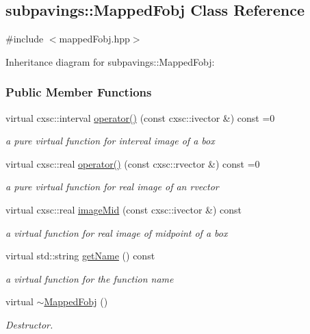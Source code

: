 \hypertarget{classsubpavings_1_1MappedFobj}{\subsection{subpavings\-:\-:\-Mapped\-Fobj \-Class \-Reference}
\label{classsubpavings_1_1MappedFobj}
}


{\ttfamily \#include $<$mapped\-Fobj.\-hpp$>$}



\-Inheritance diagram for subpavings\-:\-:\-Mapped\-Fobj\-:
\subsubsection*{\-Public \-Member \-Functions}
\begin{DoxyCompactItemize}
\item 
virtual cxsc\-::interval \hyperlink{classsubpavings_1_1MappedFobj_aad44e53cb112ea94a970a9bf3888fa6b}{operator()} (const cxsc\-::ivector \&) const =0
\begin{DoxyCompactList}\small\item\em a pure virtual function for interval image of a box \end{DoxyCompactList}\item 
virtual cxsc\-::real \hyperlink{classsubpavings_1_1MappedFobj_aed79714dcf7fb4eb54d0488428909291}{operator()} (const cxsc\-::rvector \&) const =0
\begin{DoxyCompactList}\small\item\em a pure virtual function for real image of an rvector \end{DoxyCompactList}\item 
virtual cxsc\-::real \hyperlink{classsubpavings_1_1MappedFobj_afc045feebc8ad8fc2a84e0532bf0648d}{image\-Mid} (const cxsc\-::ivector \&) const 
\begin{DoxyCompactList}\small\item\em a virtual function for real image of midpoint of a box \end{DoxyCompactList}\item 
virtual std\-::string \hyperlink{classsubpavings_1_1MappedFobj_a852f7fc0282f2e331f4c10f459dc96ae}{get\-Name} () const 
\begin{DoxyCompactList}\small\item\em a virtual function for the function name \end{DoxyCompactList}\item 
virtual \hyperlink{classsubpavings_1_1MappedFobj_ae42c1a843a61e079d1f0599f1ba01258}{$\sim$\-Mapped\-Fobj} ()
\begin{DoxyCompactList}\small\item\em \-Destructor. \end{DoxyCompactList}\end{DoxyCompactItemize}


